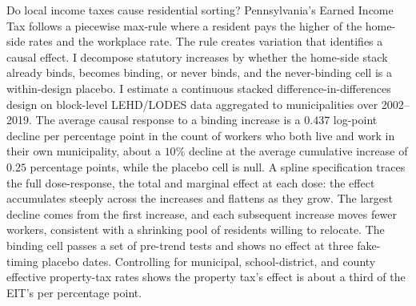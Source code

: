 Do local income taxes cause residential sorting?
Pennsylvania's Earned Income Tax follows a piecewise max-rule where a
resident pays the higher of the home-side rates and the workplace
rate. The rule creates variation that identifies a causal effect. I
decompose statutory increases by whether the home-side stack already
binds, becomes binding, or never binds, and the never-binding cell is a within-design placebo. I estimate a continuous stacked
difference-in-differences design on block-level LEHD/LODES data
aggregated to municipalities over 2002--2019. The average causal response to a binding increase is a $0.437$
log-point decline per percentage point in the count of workers who
both live and work in their own municipality, about a $10\%$ decline
at the average cumulative increase of $0.25$ percentage points, while
the placebo cell is null. A spline specification traces the full
dose-response, the total and marginal effect at each dose: the effect
accumulates steeply across the increases and flattens as they
grow. The largest decline comes from the first increase, and each subsequent
increase moves fewer workers, consistent with a shrinking pool of
residents willing to relocate. The binding cell passes a set of pre-trend tests and shows no
effect at three fake-timing placebo dates. Controlling for municipal, school-district, and county effective
property-tax rates shows the property tax's effect is about a third of
the EIT's per percentage point.
